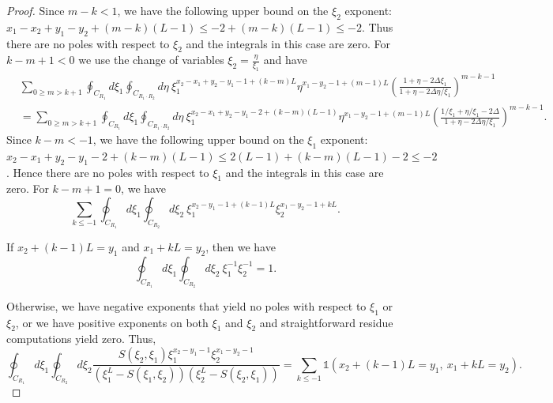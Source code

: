 \documentclass[10pt,a4paper]{amsart}
\begin{document}
\begin{proof}
Since $m-k<1$, we have the following upper bound on the $\xi_2$ exponent: $x_1-x_2 +y_1-y_2+(m-k)(L-1)\leq -2 + (m-k)(L-1) \leq -2$. Thus there are no poles with respect to $\xi_2$ and the integrals in this case are zero. For $k-m+1<0$ we use the change of variables $\xi_2=\frac{\eta}{\xi_1}$ and have 
\begin{equation}
    \begin{split}
        &\sum_{0\geq m>k+1}\oint_{C_{R_1}}d\xi_1\oint_{C_{R_1\cdot R_2}}d\eta \ \xi_1^{x_2-x_1+y_2-y_1-1+(k-m)L}\eta^{x_1-y_2-1+(m-1)L}\left(\frac{1+\eta-2\Delta\xi_1}{1+\eta-2\Delta\eta/\xi_1}\right)^{m-k-1} \\
        &=\sum_{0\geq m>k+1}\oint_{C_{R_1}}d\xi_1\oint_{C_{R_1\cdot R_2}}d\eta \ \xi_1^{x_2-x_1+y_2-y_1-2+(k-m)(L-1)}\eta^{x_1-y_2-1+(m-1)L}\left(\frac{1/\xi_1+\eta/\xi_1-2\Delta}{1+\eta-2\Delta\eta/\xi_1}\right)^{m-k-1}.
    \end{split}
\end{equation}
Since $k-m<-1$, we have the following upper bound on the $\xi_1$ exponent: $x_2-x_1+y_2-y_1-2 + (k-m)(L-1) \leq 2(L-1) + (k-m)(L-1)-2 \leq -2$. Hence there are no poles with respect to $\xi_1$ and the integrals in this case are zero. For $k-m+1=0$, we have
\begin{equation}
    \sum_{k\leq -1}\oint_{C_{R_1}}d\xi_1\oint_{C_{R_2}}d\xi_2 \ \xi_1^{x_2-y_1-1+(k-1)L}\xi_2^{x_1-y_2-1+kL}.
\end{equation}

If $x_2+(k-1)L=y_1$ and $x_1+kL=y_2$, then we have 
\begin{equation}
    \oint_{C_{R_1}}d\xi_1\oint_{C_{R_2}}d\xi_2 \ \xi_1^{-1}\xi_2^{-1} = 1.
\end{equation}

Otherwise, we have negative exponents that yield no poles with respect to $\xi_1$ or $\xi_2$, or we have positive exponents on both $\xi_1$ and $\xi_2$ and straightforward residue computations yield zero. Thus, 
\begin{equation}
    \oint_{C_{R_1}}d\xi_1\oint_{C_{R_2}}d\xi_2 \frac{S(\xi_2,\xi_1)\xi_1^{x_2-y_1-1}\xi_2^{x_1-y_2-1}}{\left(\xi_1^L - S(\xi_1,\xi_2) \right)\left(\xi_2^L - S(\xi_2,\xi_1) \right)} = \sum_{k\leq -1}\mathds{1}\left(x_2+(k-1)L=y_1, \ x_1+kL=y_2 \right).
\end{equation}


\end{proof}
\end{document}
